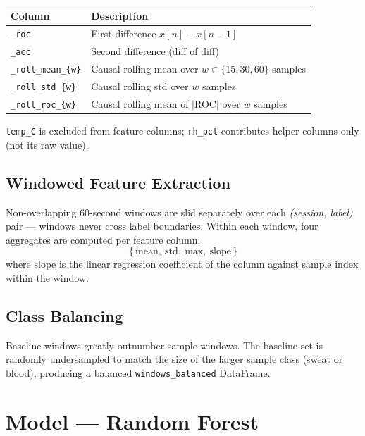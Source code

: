 \documentclass[11pt,a4paper]{article}
\begin{document}
\begin{center}
\begin{tabular}{ll}
\toprule
Column & Description \\
\midrule
\texttt{\_roc}         & First difference $x[n] - x[n-1]$ \\
\texttt{\_acc}         & Second difference (diff of diff) \\
\texttt{\_roll\_mean\_\{w\}} & Causal rolling mean over $w \in \{15, 30, 60\}$ samples \\
\texttt{\_roll\_std\_\{w\}}  & Causal rolling std over $w$ samples \\
\texttt{\_roll\_roc\_\{w\}}  & Causal rolling mean of $|$ROC$|$ over $w$ samples \\
\bottomrule
\end{tabular}
\end{center}

\texttt{temp\_C} is excluded from feature columns; \texttt{rh\_pct} contributes
helper columns only (not its raw value).

\subsection{Windowed Feature Extraction}

Non-overlapping 60-second windows are slid separately over each
\emph{(session, label)} pair --- windows never cross label boundaries.
Within each window, four aggregates are computed per feature column:
\[
  \{\,\text{mean},\ \text{std},\ \text{max},\ \text{slope}\,\}
\]
where slope is the linear regression coefficient of the column against sample
index within the window.

\subsection{Class Balancing}

Baseline windows greatly outnumber sample windows.  The baseline set is
randomly undersampled to match the size of the larger sample class (sweat or
blood), producing a balanced \texttt{windows\_balanced} DataFrame.

\section{Model --- Random Forest}
\end{document}
